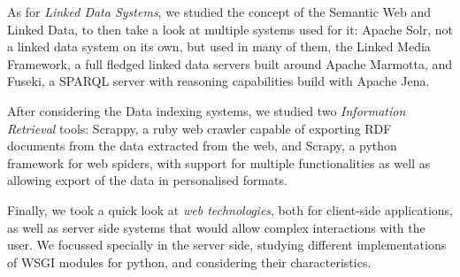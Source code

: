 As for \emph{Linked Data Systems}, we studied the concept of the Semantic Web and Linked Data, to then take a look at multiple systems used for it: Apache Solr, not a linked data system on its own, but used in many of them, the Linked Media Framework, a full fledged linked data servers built around Apache Marmotta, and Fuseki, a SPARQL server with reasoning capabilities build with Apache Jena.

After considering the Data indexing systems, we studied two \emph{Information Retrieval} tools: Scrappy, a ruby web crawler capable of exporting RDF documents from the data extracted from the web, and Scrapy, a python framework for web spiders, with support for multiple functionalities as well as allowing export of the data in personalised formats.

Finally, we took a quick look at \emph{web technologies}, both for client-side applications, as well as server side systems that would allow complex interactions with the user. We focussed specially in the server side, studying different implementations of WSGI modules for python, and considering their characteristics.
